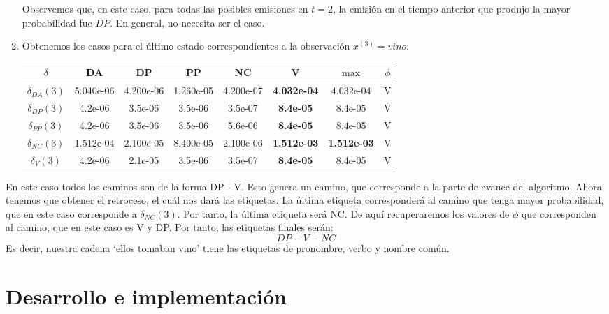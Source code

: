 \begin{enumerate}
     Observemos que, en este caso, para todas las posibles emisiones en $t=2$, la emisión en el tiempo anterior que produjo la mayor probabilidad fue $DP$.  En general, no necesita ser el caso.

     \item Obtenemos los casos para el último estado correspondientes a la observación $x^{(3)} = vino$:
        \begin{center}
        {\small
         \begin{tabular}{c c c c c c | c c} \hline
            $\delta$ & DA & DP & PP & NC & V & $\max$ & $\phi$\\ \hline
            $\delta_{DA}(3)$  & 5.040e-06 & 4.200e-06 & 1.260e-05 & 4.200e-07 & \textbf{4.032e-04} & 4.032e-04 & V \\
            $\delta_{DP}(3)$  & 4.2e-06 & 3.5e-06 & 3.5e-06 & 3.5e-07 & \textbf{8.4e-05} & 8.4e-05 & V \\
            $\delta_{PP}(3)$  & 4.2e-06 & 3.5e-06 & 3.5e-06 & 5.6e-06 & \textbf{8.4e-05} & 8.4e-05 & V \\
            $\delta_{NC}(3)$  & 1.512e-04 & 2.100e-05 & 8.400e-05 & 2.100e-06 & \textbf{1.512e-03} & \textbf{1.512e-03} & V \\
            $\delta_{V}(3)$  & 4.2e-06 & 2.1e-05 & 3.5e-06 & 3.5e-07 & \textbf{8.4e-05} & 8.4e-05 & V\\ \hline
         \end{tabular}}
     \end{center}
 \end{enumerate}

En este caso todos los caminos son de la forma DP - V. Esto genera un camino, que corresponde a la parte de avance del algoritmo. Ahora tenemos que obtener el retroceso, el cuál nos dará las etiquetas. La última etiqueta corresponderá al camino que tenga mayor probabilidad, que en este caso corresponde a $\delta_{NC}(3)$. Por tanto, la última etiqueta será NC. De aquí recuperaremos los valores de $\phi$ que corresponden al camino, que en este caso es V y DP. Por tanto, las etiquetas finales serán:
$$DP - V - NC$$
Es decir, nuestra cadena `ellos tomaban vino' tiene las etiquetas de pronombre, verbo y nombre común.






\section{Desarrollo e implementación}

